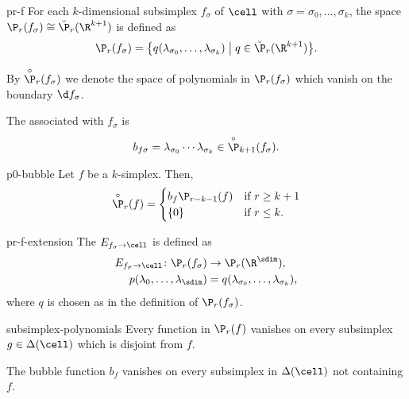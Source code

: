 \begin{Definition}{pr-f}
  For each $k$-dimensional subsimplex $f_\sigma$ of $\cell$ with
  $\sigma = \sigma_0,\dots,\sigma_k$, the space
  $\P_r(f_\sigma) \cong \breve\P_r(\R^{k+1})$ is defined as
  \begin{gather}
    \P_r(f_\sigma) = \bigl\{
    q(\lambda_{\sigma_0},\dots,\lambda_{\sigma_k})
    \;\big\vert\;
    q\in\breve \P_r(\R^{k+1})\bigr\}.
  \end{gather}
  
  By $\overset{\circ}{\P}_r(f_\sigma)$ we denote the space of
  polynomials in $\P_r(f_\sigma)$ which vanish on the boundary $\d f_\sigma$.

  The  associated with $f_\sigma$ is
  \begin{gather}
    b_{f\sigma} = \lambda_{\sigma_0}\cdots\lambda_{\sigma_k}
    \in \overset{\circ}{\P}_{k+1}(f_\sigma).
  \end{gather}
\end{Definition}

\begin{Lemma}{p0-bubble}
  Let $f$ be a $k$-simplex. Then,
  \begin{gather}
    \overset{\circ}{\P}_r(f) =
    \begin{cases}
      b_f \P_{r-k-1}(f) &\text{if } r\ge k+1\\
      \{0\} &\text{if } r \le k.
    \end{cases}
  \end{gather}
\end{Lemma}


\begin{Definition}{pr-f-extension}
  The  $E_{f_\sigma\to\cell}$ is defined as
  \begin{gather}
    \begin{split}
      E_{f_\sigma\to\cell}\colon \P_r(f_\sigma) &\to \P_r(\R^\sdim),\\
      p(\lambda_0,\dots,\lambda_\sdim) &= q(\lambda_{\sigma_0},\dots,\lambda_{\sigma_k}),
    \end{split}
  \end{gather}
  where $q$ is chosen as in the definition of $\P_r(f_\sigma)$.
\end{Definition}

\begin{Lemma}{subsimplex-polynomials}
  Every function in $\P_r(f)$ vanishes on every subsimplex
  $g\in\Delta(\cell)$ which is disjoint from $f$.

  The bubble function $b_f$ vanishes on every subsimplex in
  $\Delta(\cell)$ not containing $f$.
\end{Lemma}


